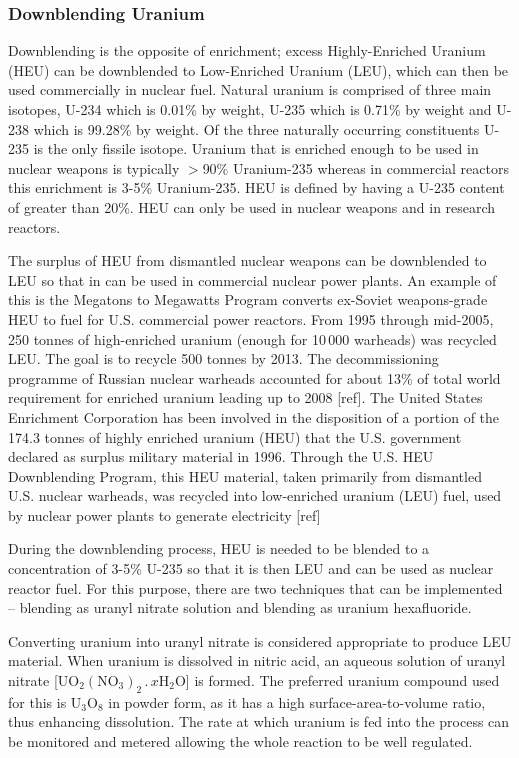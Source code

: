 \documentclass[twoside,titlepage,11pt,twocolumn,a4paper]{article}
\begin{document}
\subsubsection{Downblending Uranium}
Downblending is the opposite of enrichment; excess Highly-Enriched
Uranium (HEU) can be downblended to Low-Enriched Uranium (LEU), which
can then be used commercially in nuclear fuel. Natural uranium is
comprised of three main isotopes, U-234 which is 0.01\% by weight,
U-235 which is 0.71\% by weight and U-238 which is 99.28\% by weight.
Of the three naturally occurring constituents U-235 is the only
fissile isotope.  Uranium that is enriched enough to be used in
nuclear weapons is typically \(>\)90\% Uranium-235 whereas in
commercial reactors this enrichment is 3-5\% Uranium-235.  HEU is
defined by having a U-235 content of greater than 20\%. HEU can only
be used in nuclear weapons and in research reactors.

The surplus of HEU from dismantled nuclear weapons can be downblended
to LEU so that in can be used in commercial nuclear power plants. An
example of this is the Megatons to Megawatts Program converts
ex-Soviet weapons-grade HEU to fuel for U.S. commercial power
reactors. From 1995 through mid-2005, 250 tonnes of high-enriched
uranium (enough for 10\,000 warheads) was recycled LEU. The goal is to
recycle 500 tonnes by 2013. The decommissioning programme of Russian
nuclear warheads accounted for about 13\% of total world requirement
for enriched uranium leading up to 2008 [ref]. The United States
Enrichment Corporation has been involved in the disposition of a
portion of the 174.3 tonnes of highly enriched uranium (HEU) that the
U.S. government declared as surplus military material in 1996. Through
the U.S. HEU Downblending Program, this HEU material, taken primarily
from dismantled U.S. nuclear warheads, was recycled into low-enriched
uranium (LEU) fuel, used by nuclear power plants to generate
electricity [ref]

During the downblending process, HEU is needed to be blended to a
concentration of 3-5\% U-235 so that it is then LEU and can be used as
nuclear reactor fuel. For this purpose, there are two techniques that
can be implemented -- blending as uranyl nitrate solution and blending
as uranium hexafluoride.

Converting uranium into uranyl nitrate is considered appropriate to
produce LEU material.  When uranium is dissolved in nitric acid, an
aqueous solution of uranyl nitrate
[\(\mathrm{UO_2(NO_3)_2\,.\,}x\mathrm{H_2O}\)] is formed. The
preferred uranium compound used for this is \(\mathrm{U_3O_8}\) in
powder form, as it has a high surface-area-to-volume ratio, thus
enhancing dissolution. The rate at which uranium is fed into the
process can be monitored and metered allowing the whole reaction to be
well regulated.
\end{document}

